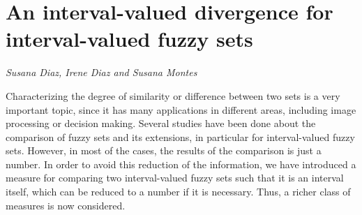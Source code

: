 \documentclass[../booklet.tex]{subfiles}
\begin{document}
\section[An interval-valued divergence for interval-valued fuzzy sets. {\it Susana Diaz, Irene Diaz and Susana Montes}]{An interval-valued divergence for interval-valued fuzzy sets}
  

\begin{center}
  {\it Susana Diaz, Irene Diaz and Susana Montes}
\end{center}

\vskip 0.8cm


Characterizing the degree of similarity or difference between two sets is a very important topic, since it has many applications in different areas, including image processing or decision making. Several studies have been done about the comparison of fuzzy sets and its extensions, in particular for interval-valued fuzzy sets. However, in most of the cases, the results of the comparison is just a number. In order to avoid this reduction of the information, we have introduced a measure for comparing two interval-valued fuzzy sets such that it is an interval itself, which can be reduced to a number if it is  necessary. Thus,  a richer class of measures is now considered.

\end{document}
